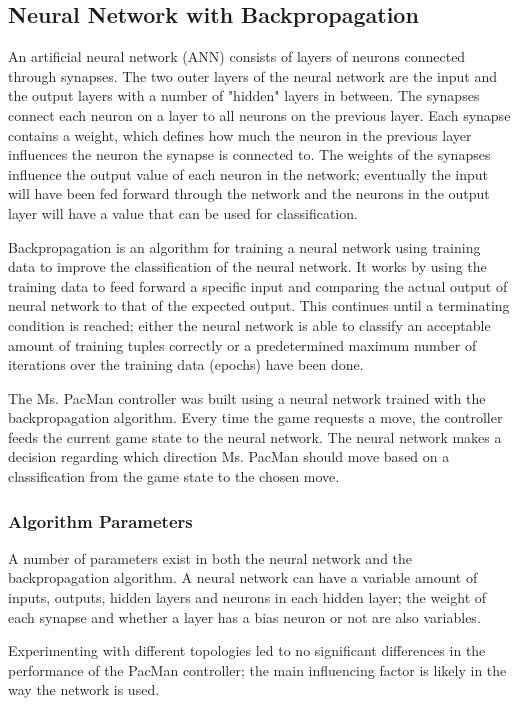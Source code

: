 \subsection{Neural Network with Backpropagation}
An artificial neural network (ANN) consists of layers of neurons connected through synapses. The two outer layers of the neural network are the input and the output layers with a number of "hidden" layers in between. The synapses connect each neuron on a layer to all neurons on the previous layer. Each synapse contains a weight, which defines how much the neuron in the previous layer influences the neuron the synapse is connected to. The weights of the synapses influence the output value of each neuron in the network; eventually the input will have been fed forward through the network and the neurons in the output layer will have a value that can be used for classification\cite{lecture6}.

Backpropagation is an algorithm for training a neural network using training data to improve the classification of the neural network. It works by using the training data to feed forward a specific input and comparing the actual output of neural network to that of the expected output. This continues until a terminating condition is reached; either the neural network is able to classify an acceptable amount of training tuples correctly or a predetermined maximum number of iterations over the training data (epochs) have been done\cite{ross1999, Han:2011:DMC:1972541, lecture6}.

The Ms. PacMan controller was built using a neural network trained with the backpropagation algorithm. Every time the game requests a move, the controller feeds the current game state to the neural network. The neural network makes a decision regarding which direction Ms. PacMan should move based on a classification from the game state to the chosen move.

\subsubsection{Algorithm Parameters}
A number of parameters exist in both the neural network and the backpropagation algorithm. A neural network can have a variable amount of inputs, outputs, hidden layers and neurons in each hidden layer; the weight of each synapse and whether a layer has a bias neuron or not are also variables.

Experimenting with different topologies led to no significant differences in the performance of the PacMan controller; the main influencing factor is likely in the way the network is used.

